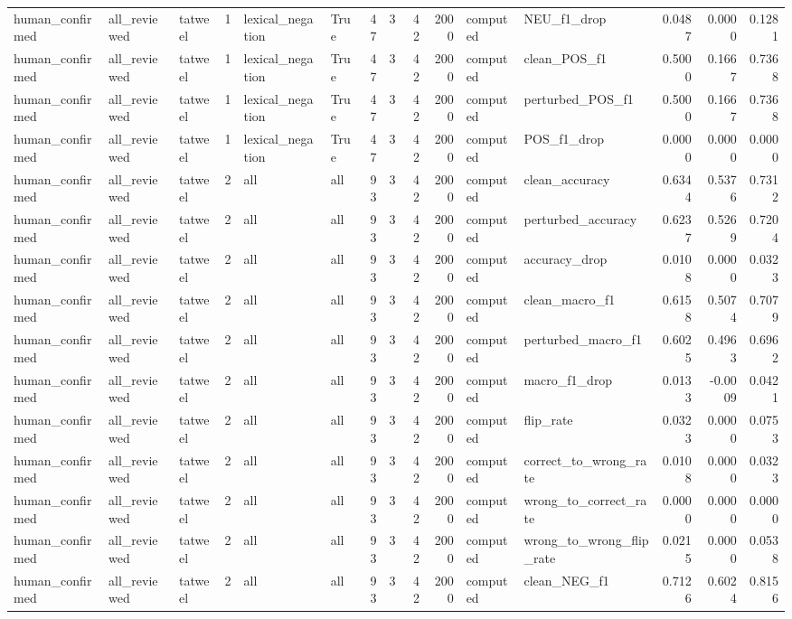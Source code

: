 \begin{tabular}{lllrllrrrrllrrr}
human_confirmed & all_reviewed & tatweel & 1 & lexical_negation & True & 47 & 3 & 42 & 2000 & computed & NEU_f1_drop & 0.0487 & 0.0000 & 0.1281 \\
human_confirmed & all_reviewed & tatweel & 1 & lexical_negation & True & 47 & 3 & 42 & 2000 & computed & clean_POS_f1 & 0.5000 & 0.1667 & 0.7368 \\
human_confirmed & all_reviewed & tatweel & 1 & lexical_negation & True & 47 & 3 & 42 & 2000 & computed & perturbed_POS_f1 & 0.5000 & 0.1667 & 0.7368 \\
human_confirmed & all_reviewed & tatweel & 1 & lexical_negation & True & 47 & 3 & 42 & 2000 & computed & POS_f1_drop & 0.0000 & 0.0000 & 0.0000 \\
human_confirmed & all_reviewed & tatweel & 2 & all & all & 93 & 3 & 42 & 2000 & computed & clean_accuracy & 0.6344 & 0.5376 & 0.7312 \\
human_confirmed & all_reviewed & tatweel & 2 & all & all & 93 & 3 & 42 & 2000 & computed & perturbed_accuracy & 0.6237 & 0.5269 & 0.7204 \\
human_confirmed & all_reviewed & tatweel & 2 & all & all & 93 & 3 & 42 & 2000 & computed & accuracy_drop & 0.0108 & 0.0000 & 0.0323 \\
human_confirmed & all_reviewed & tatweel & 2 & all & all & 93 & 3 & 42 & 2000 & computed & clean_macro_f1 & 0.6158 & 0.5074 & 0.7079 \\
human_confirmed & all_reviewed & tatweel & 2 & all & all & 93 & 3 & 42 & 2000 & computed & perturbed_macro_f1 & 0.6025 & 0.4963 & 0.6962 \\
human_confirmed & all_reviewed & tatweel & 2 & all & all & 93 & 3 & 42 & 2000 & computed & macro_f1_drop & 0.0133 & -0.0009 & 0.0421 \\
human_confirmed & all_reviewed & tatweel & 2 & all & all & 93 & 3 & 42 & 2000 & computed & flip_rate & 0.0323 & 0.0000 & 0.0753 \\
human_confirmed & all_reviewed & tatweel & 2 & all & all & 93 & 3 & 42 & 2000 & computed & correct_to_wrong_rate & 0.0108 & 0.0000 & 0.0323 \\
human_confirmed & all_reviewed & tatweel & 2 & all & all & 93 & 3 & 42 & 2000 & computed & wrong_to_correct_rate & 0.0000 & 0.0000 & 0.0000 \\
human_confirmed & all_reviewed & tatweel & 2 & all & all & 93 & 3 & 42 & 2000 & computed & wrong_to_wrong_flip_rate & 0.0215 & 0.0000 & 0.0538 \\
human_confirmed & all_reviewed & tatweel & 2 & all & all & 93 & 3 & 42 & 2000 & computed & clean_NEG_f1 & 0.7126 & 0.6024 & 0.8156 \\

\end{tabular}
